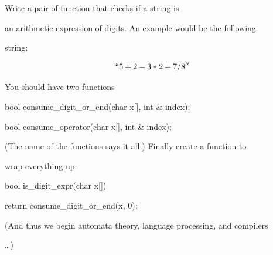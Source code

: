 Write a pair of function that checks if a string is

an arithmetic expression of digits. An example would be the following

string:

\[

``5+2-3*2+7/8''

\]

You should have two functions



\begin{consolethree}[escapeinside=||]

bool consume_digit_or_end(char x[], int & index);

bool consume_operator(char x[], int & index);

\end{consolethree}



(The name of the functions says it all.) Finally create a function to

wrap everything up:



\begin{consolethree}[escapeinside=||]

bool is_digit_expr(char x[])

{

    return consume_digit_or_end(x, 0);

}

\end{consolethree}



(And thus we begin automata theory, language processing, and compilers

\ldots)

